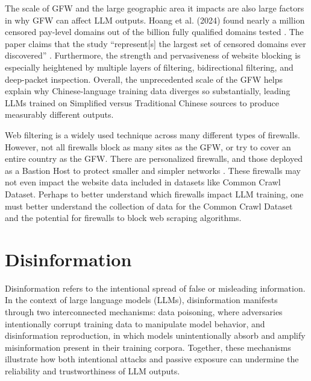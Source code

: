 \documentclass[conference=acm]{confpaper}
\begin{document}
The scale of GFW and the large geographic area it impacts are also large factors in why GFW can affect LLM outputs. Hoang et al. (2024) found nearly a million censored pay-level domains out of the billion fully qualified domains tested \cite{Hoang}. The paper claims that the study “represent[s] the largest set of censored domains ever discovered” \cite{Hoang}. Furthermore, the strength and pervasiveness of website blocking is especially heightened by multiple layers of filtering, bidirectional filtering, and deep-packet inspection. Overall, the unprecedented scale of the GFW helps explain why Chinese-language training data diverges so substantially, leading LLMs trained on Simplified versus Traditional Chinese sources to produce measurably different outputs.

Web filtering is a widely used technique across many different types of firewalls. However, not all firewalls block as many sites as the GFW, or try to cover an entire country as the GFW. There are personalized firewalls, and those deployed as a Bastion Host to protect smaller and simpler networks \cite{Rao}. These firewalls may not even impact the website data included in datasets like Common Crawl Dataset. Perhaps to better understand which firewalls impact LLM training, one must better understand the collection of data for the Common Crawl Dataset and the potential for firewalls to block web scraping algorithms.


\section{Disinformation}
Disinformation refers to the intentional spread of false or misleading information. In the context of large language models (LLMs), disinformation manifests through two interconnected mechanisms: data poisoning, where adversaries intentionally corrupt training data to manipulate model behavior, and disinformation reproduction, in which models unintentionally absorb and amplify misinformation present in their training corpora. Together, these mechanisms illustrate how both intentional attacks and passive exposure can undermine the reliability and trustworthiness of LLM outputs.
\end{document}
